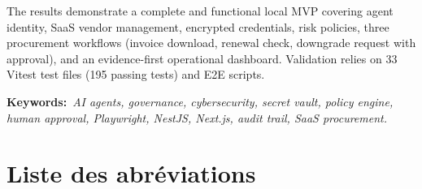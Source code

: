 \documentclass[12pt,a4paper,oneside]{report}
\begin{document}
\medskip
The results demonstrate a complete and functional local MVP covering agent
identity, SaaS vendor management, encrypted credentials, risk policies,
three procurement workflows (invoice download, renewal check, downgrade
request with approval), and an evidence-first operational dashboard.
Validation relies on 33 Vitest test files (195 passing tests) and E2E
scripts.

\medskip\noindent
\textbf{Keywords:}~\textit{AI agents, governance, cybersecurity, secret
vault, policy engine, human approval, Playwright, NestJS, Next.js,
audit trail, SaaS procurement.}

\clearpage
\tableofcontents
\thispagestyle{plain}

\clearpage
\listoffigures
{}

\clearpage
\listoftables
{}

\clearpage
\chapter*{Liste des abréviations}
\thispagestyle{plain}
\end{document}
